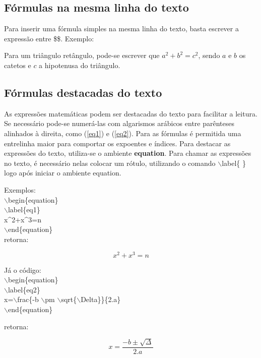 \subsection{Fórmulas na mesma linha do texto}
Para inserir uma fórmula simples na mesma linha do texto, basta escrever a expressão entre \$\$. Exemplo:

Para um triângulo retângulo, pode-se escrever que $a^2+b^2=c^2$, sendo $a$ e $b$ os catetos e $c$ a hipotenusa do triângulo.


\subsection{Fórmulas destacadas do texto}
As expressões matemáticas podem ser destacadas do texto para facilitar a leitura. Se necessário pode-se numerá-las com algarismos arábicos entre parênteses alinhados à direita, como (\ref{eq1}) e (\ref{eq2}). Para as fórmulas é permitida uma entrelinha maior para comportar os expoentes e índices. Para destacar as expressões do texto, utiliza-se o ambiente \textbf{equation}. Para chamar as expressões no texto, é necessário nelas colocar um rótulo, utilizando o comando $\backslash$label\{ \} logo após iniciar o ambiente equation.

Exemplos:\\

\noindent
$\backslash$begin\{equation\}\\
$\backslash$label\{eq1\}\\
x\string^2+x\string^3=n\\
$\backslash$end\{equation\}\\

retorna:

\begin{equation}
\label{eq1}
x^2+x^3=n
\end{equation}

Já o código:\\

\noindent
$\backslash$begin\{equation\}\\
$\backslash$label\{eq2\}\\
x=$\backslash$frac\{-b $\backslash$pm $\backslash$sqrt\{$\backslash$Delta\}\}\{2.a\}\\
$\backslash$end\{equation\}

retorna:

\begin{equation}
\label{eq2}
x=\frac{-b \pm \sqrt{\Delta}}{2.a}
\end{equation}

